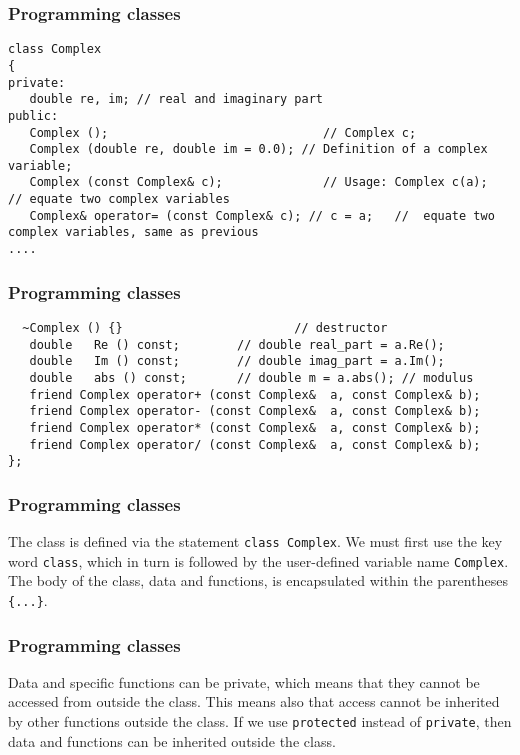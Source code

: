 \documentclass{beamer}
\begin{document}
\begin{frame}
\frametitle{Programming classes}

\begin{verbatim}
class Complex
{
private:
   double re, im; // real and imaginary part
public:
   Complex ();                              // Complex c;
   Complex (double re, double im = 0.0); // Definition of a complex variable;
   Complex (const Complex& c);              // Usage: Complex c(a);   // equate two complex variables
   Complex& operator= (const Complex& c); // c = a;   //  equate two complex variables, same as previous
....

\end{verbatim}
\end{frame}

\begin{frame}
\frametitle{Programming classes}

\begin{verbatim}
  ~Complex () {}                        // destructor
   double   Re () const;        // double real_part = a.Re();
   double   Im () const;        // double imag_part = a.Im();
   double   abs () const;       // double m = a.abs(); // modulus
   friend Complex operator+ (const Complex&  a, const Complex& b);
   friend Complex operator- (const Complex&  a, const Complex& b);
   friend Complex operator* (const Complex&  a, const Complex& b);
   friend Complex operator/ (const Complex&  a, const Complex& b);
};
\end{verbatim}
\end{frame}

\begin{frame}
\frametitle{Programming classes}

The class is defined via the statement \Verb!class Complex!. We must first use the key word
\Verb!class!, which in turn is followed by the user-defined variable name  \Verb!Complex!.
The body of the class, data and functions, is encapsulated  within the parentheses \Verb!{...}!.
\end{frame}

\begin{frame}
\frametitle{Programming classes}

Data and specific functions can be private, which means that they cannot be accessed from outside the class.
This means also that access cannot be inherited by other functions outside the class. If we use \Verb!protected!
instead of \Verb!private!, then data and functions can be inherited outside the class.
\end{frame}
\end{document}
